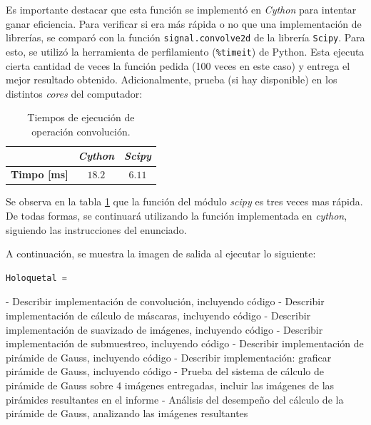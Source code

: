 \par Es importante destacar que esta función se implementó en \textit{Cython} para intentar ganar eficiencia. Para verificar si era más rápida o no que una implementación de librerías, se comparó con la función \texttt{signal.convolve2d} de la librería \texttt{Scipy}. Para esto, se utilizó la herramienta de perfilamiento (\texttt{\%timeit}) de Python. Esta ejecuta cierta cantidad de veces la función pedida (100 veces en este caso) y entrega el mejor resultado obtenido. Adicionalmente, prueba (si hay disponible) en los distintos \textit{cores} del computador:


\begin{table}[H]
  \centering
  \begin{tabular}{|c|c|c|}
  \hline
                          & \textit{\textbf{Cython}} & \textit{\textbf{Scipy}} \\ \hline
  \textbf{Timpo {[}ms{]}} & $18.2$                     & $6.11$                    \\ \hline
  \end{tabular}
  \label{table:profile}
  \caption{Tiempos de ejecución de operación convolución.}
\end{table}

\par Se observa en la tabla \ref{table:profile} que la función del módulo \textit{scipy} es tres veces mas rápida. De todas formas, se continuará utilizando la función implementada en \textit{cython}, siguiendo las instrucciones del enunciado.

\par A continuación, se muestra la imagen de salida al ejecutar lo siguiente:
\begin{lstlisting}[language=Python, label = code:convCodeejec, caption=Implementación de convolución en Cython.]
  Holoquetal = 
\end{lstlisting}

\bigskip
- Describir implementación de convolución, incluyendo código
- Describir implementación de cálculo de máscaras, incluyendo código
- Describir implementación de suavizado de imágenes, incluyendo código
- Describir implementación de submuestreo, incluyendo código
- Describir implementación de pirámide de Gauss, incluyendo código
- Describir implementación: graficar pirámide de Gauss, incluyendo código
- Prueba del sistema de cálculo de pirámide de Gauss sobre 4 imágenes entregadas, incluir las
imágenes de las pirámides resultantes en el informe
- Análisis del desempeño del cálculo de la pirámide de Gauss, analizando las imágenes resultantes


